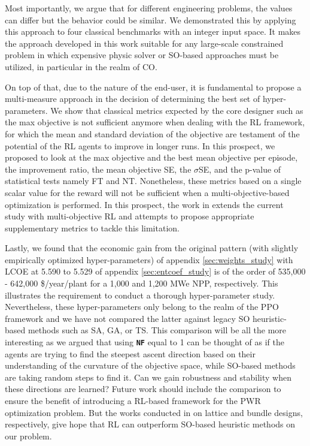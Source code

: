 \documentclass[a4paper]{article}
\newcommand{\code}[1]{\colorbox{light-gray}{\small\color{blue}\textbf{\texttt{#1}}}}
\begin{document}
 Most importantly, we argue that for different engineering problems, the values can differ but the behavior could be similar. We demonstrated this by applying this approach to four classical benchmarks with an integer input space. It makes the approach developed in this work suitable for any large-scale constrained problem in which expensive physic solver or SO-based approaches must be utilized, in particular in the realm of CO.


 On top of that, due to the nature of the end-user, it is fundamental to propose a multi-measure approach in the decision of determining the best set of hyper-parameters.  We show that classical metrics expected by the core designer such as the max objective is not sufficient anymore when dealing with the RL framework, for which the mean and standard deviation of the objective are testament of the potential of the RL agents to improve in longer runs. In this prospect, we proposed to look at the max objective and the best mean objective per episode, the improvement ratio, the mean objective SE, the $\sigma$SE, and the p-value of statistical tests namely FT and NT. Nonetheless, these metrics based on a single scalar value for the reward will not be sufficient when a multi-objective-based optimization is performed. In this prospect, the work in \cite{seurin2023pareto} extends the current study with multi-objective RL and attempts to propose appropriate supplementary metrics to tackle this limitation. 
 
 Lastly, we found that the economic gain from the original pattern (with slightly empirically optimized hyper-parameters) of appendix \ref{sec:weights_study} with LCOE at 5.590 to 5.529 of appendix \ref{sec:entcoef_study} is of the order of 535,000 - 642,000 \$/year/plant for a 1,000 and 1,200 MWe NPP, respectively. This illustrates the requirement to conduct a thorough hyper-parameter study. Nevertheless, these hyper-parameters only belong to the realm of the PPO framework and we have not compared the latter against legacy SO heuristic-based methods such as SA, GA, or TS. This comparison will be all the more interesting as we argued that using \code{NF} equal to 1 can be thought of as if the agents are trying to find the steepest ascent direction based on their understanding of the curvature of the objective space, while SO-based methods are taking random steps to find it. Can we gain robustness and stability when these directions are learned? Future work should include the comparison to ensure the benefit of introducing a RL-based framework for the PWR optimization problem. But the works conducted in \cite{radaideh2021large,radaideh2021physics} on lattice and bundle designs, respectively, give hope that RL can outperform SO-based heuristic methods on our problem. 
\end{document}
